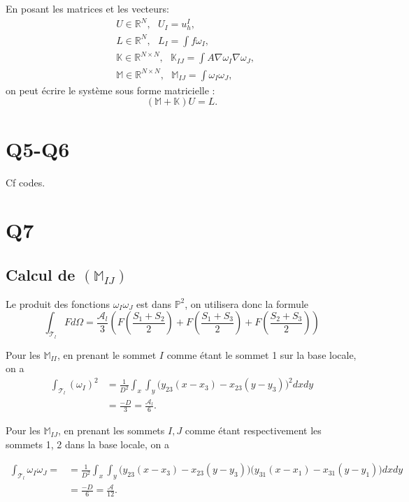 \documentclass[11pt]{article}
\newcommand{\A}{\mathcal{A}}
\newcommand{\R}{\mathbb{R}}
\newcommand{\K}{\mathbb{K}}
\newcommand{\M}{\mathbb{M}}
\newcommand{\ms}{~~~}
\begin{document}
En posant les matrices et les vecteurs:
\begin{align}
  &U \in \R^{N}, \ms U_{I} = u_h^I, \\
  &L \in \R^{N}, \ms L_{I} = \int f \omega_I, \\
  &\K \in \R^{N\times N},\ms \K_{IJ} = \int A \nabla \omega_I \nabla \omega_J,  \\
  &\M \in \R^{N\times N},\ms \M_{IJ} = \int \omega_I \omega_J,
\end{align}
on peut écrire le système sous forme matricielle :
\begin{equation}
  (\M+\K) U = L.
\end{equation}

\section{Q5-Q6}

Cf codes.

\section{Q7}

\subsection{Calcul de $(\M_{IJ})$}

Le produit des fonctions $\omega_I\omega_J$ est dans $\mathbb{P}^2$, on utilisera donc la formule
\begin{equation}
  \int_{\mathcal{T}_l} F d\Omega = \frac{\A_l}{3}\left(F\left(\frac{S_1+S_2}{2}\right) + F\left(\frac{S_1+S_3}{2}\right) + F\left(\frac{S_2+S_3}{2}\right) \right)
\end{equation}

Pour les $\M_{II}$, en prenant le sommet $I$ comme étant le sommet 1 sur la base locale, on a 
\begin{align}
  \int_{\mathcal{T}_l} (\omega_I)^2
  &= \frac{1}{D^2} \int_x \int_y \big(y_{23} (x-x_3) - x_{23} (y-y_3)\big)^2 dx dy \\
  &= \frac{-D}{3} = \frac{\A_l}{6}.
\end{align}

Pour les $\M_{IJ}$, en prenant les sommets $I, J$ comme étant respectivement les sommets 1, 2 dans la base locale, on a

\begin{align}
  \int_{\mathcal{T}_l} \omega_I \omega_J =
  &= \frac{1}{D^2} \int_x \int_y \big(y_{23} (x-x_3) - x_{23} (y-y_3)\big)\big(y_{31} (x-x_1) - x_{31} (y-y_1)\big) dx dy \\
  &= \frac{-D}{6} = \frac{\A}{12}.
\end{align}
\end{document}
